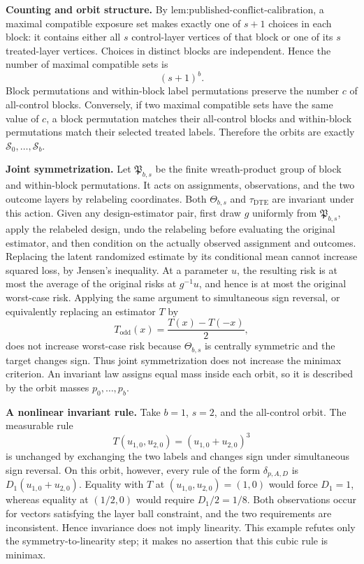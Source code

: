 \textbf{Counting and orbit structure.}  By \(\text{lem:published-conflict-calibration}\), a maximal compatible exposure set makes exactly one of \(s+1\) choices in each block: it contains either all \(s\) control-layer vertices of that block or one of its \(s\) treated-layer vertices.  Choices in distinct blocks are independent.  Hence the number of maximal compatible sets is
\[
(s+1)^b.
\]
Block permutations and within-block label permutations preserve the number \(c\) of all-control blocks.  Conversely, if two maximal compatible sets have the same value of \(c\), a block permutation matches their all-control blocks and within-block permutations match their selected treated labels.  Therefore the orbits are exactly \(\mathcal S_0,\ldots,\mathcal S_b\).

\textbf{Joint symmetrization.}  Let \(\mathfrak P_{b,s}\) be the finite wreath-product group of block and within-block permutations.  It acts on assignments, observations, and the two outcome layers by relabeling coordinates.  Both \(\Theta_{b,s}\) and \(\tau_{\mathrm{DTE}}\) are invariant under this action.  Given any design-estimator pair, first draw \(g\) uniformly from \(\mathfrak P_{b,s}\), apply the relabeled design, undo the relabeling before evaluating the original estimator, and then condition on the actually observed assignment and outcomes.  Replacing the latent randomized estimate by its conditional mean cannot increase squared loss, by Jensen's inequality.  At a parameter \(u\), the resulting risk is at most the average of the original risks at \(g^{-1}u\), and hence is at most the original worst-case risk.  Applying the same argument to simultaneous sign reversal, or equivalently replacing an estimator \(T\) by
\[
T_{\mathrm{odd}}(x)=\frac{T(x)-T(-x)}2,
\]
does not increase worst-case risk because \(\Theta_{b,s}\) is centrally symmetric and the target changes sign.  Thus joint symmetrization does not increase the minimax criterion.  An invariant law assigns equal mass inside each orbit, so it is described by the orbit masses \(p_0,\ldots,p_b\).

\textbf{A nonlinear invariant rule.}  Take \(b=1\), \(s=2\), and the all-control orbit.  The measurable rule
\[
T(u_{1,0},u_{2,0})=(u_{1,0}+u_{2,0})^3
\]
is unchanged by exchanging the two labels and changes sign under simultaneous sign reversal.  On this orbit, however, every rule of the form \(\delta_{p,A,D}\) is \(D_1(u_{1,0}+u_{2,0})\).  Equality with \(T\) at \((u_{1,0},u_{2,0})=(1,0)\) would force \(D_1=1\), whereas equality at \((1/2,0)\) would require \(D_1/2=1/8\).  Both observations occur for vectors satisfying the layer ball constraint, and the two requirements are inconsistent.  Hence invariance does not imply linearity.  This example refutes only the symmetry-to-linearity step; it makes no assertion that this cubic rule is minimax.